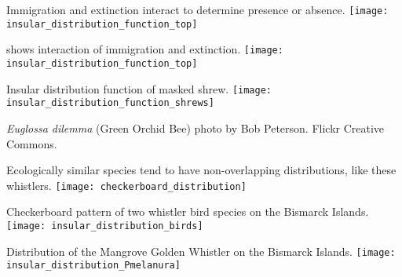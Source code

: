 \documentclass[t]{beamer}
\begin{document}
\begin{frame}{Immigration and extinction interact to determine presence or absence.}
	\centering
		\texttt{[image: insular\_distribution\_function\_top]}\\
\end{frame}

\begin{frame}{ shows interaction of immigration and extinction.}
	\centering
		\texttt{[image: insular\_distribution\_function\_top]}\\
\end{frame}

\begin{frame}{Insular distribution function of masked shrew.}
	\centering
		\texttt{[image: insular\_distribution\_function\_shrews]}\\
	\pause
\end{frame}

{
\begin{frame}[b,plain]
\color{white}\tiny{\textit{Euglossa dilemma} (Green Orchid Bee) photo by Bob Peterson. Flickr Creative Commons.}
\end{frame}
}

\begin{frame}{Ecologically similar species tend to have non-overlapping distributions, like these whistlers.}
	\centering
		\texttt{[image: checkerboard\_distribution]}\\
\end{frame}

\begin{frame}{Checkerboard pattern of two whistler bird species on the Bismarck Islands.}
	\centering
		\texttt{[image: insular\_distribution\_birds]}\\
\end{frame}

\begin{frame}{Distribution of the Mangrove Golden Whistler on the Bismarck Islands.}
	\centering
		\texttt{[image: insular\_distribution\_Pmelanura]}\\
\end{frame}
\end{document}
